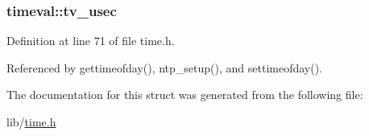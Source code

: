 \subsubsection[{\texorpdfstring{tv\+\_\+usec}{tv_usec}}]{ timeval\+::tv\+\_\+usec}\hypertarget{structtimeval_a8fd7abf5420981b3ff58bb23df458587}{}\label{structtimeval_a8fd7abf5420981b3ff58bb23df458587}


Definition at line 71 of file time.\+h.



Referenced by gettimeofday(), ntp\+\_\+setup(), and settimeofday().



The documentation for this struct was generated from the following file\+:\begin{DoxyCompactItemize}
\item 
lib/\hyperlink{time_8h}{time.\+h}\end{DoxyCompactItemize}

